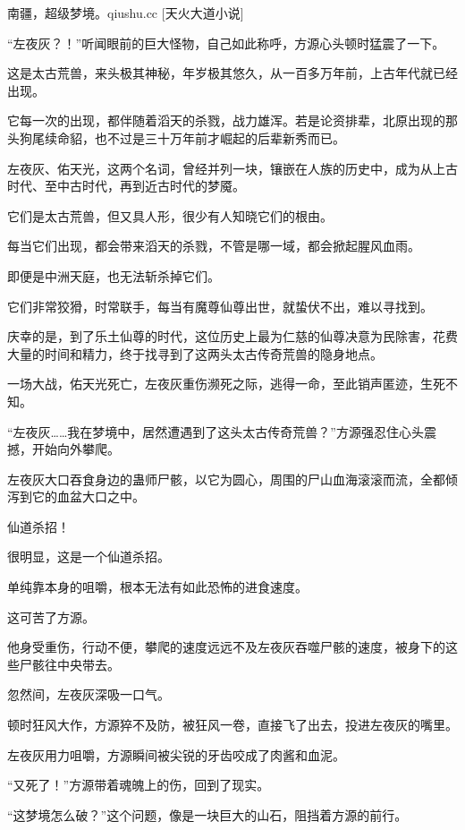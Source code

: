 
\begin{this_body}

南疆，超级梦境。qiushu.cc [天火大道小说]

“左夜灰？！”听闻眼前的巨大怪物，自己如此称呼，方源心头顿时猛震了一下。

这是太古荒兽，来头极其神秘，年岁极其悠久，从一百多万年前，上古年代就已经出现。

它每一次的出现，都伴随着滔天的杀戮，战力雄浑。若是论资排辈，北原出现的那头狗尾续命貂，也不过是三十万年前才崛起的后辈新秀而已。

左夜灰、佑天光，这两个名词，曾经并列一块，镶嵌在人族的历史中，成为从上古时代、至中古时代，再到近古时代的梦魇。

它们是太古荒兽，但又具人形，很少有人知晓它们的根由。

每当它们出现，都会带来滔天的杀戮，不管是哪一域，都会掀起腥风血雨。

即便是中洲天庭，也无法斩杀掉它们。

它们非常狡猾，时常联手，每当有魔尊仙尊出世，就蛰伏不出，难以寻找到。

庆幸的是，到了乐土仙尊的时代，这位历史上最为仁慈的仙尊决意为民除害，花费大量的时间和精力，终于找寻到了这两头太古传奇荒兽的隐身地点。

一场大战，佑天光死亡，左夜灰重伤濒死之际，逃得一命，至此销声匿迹，生死不知。

“左夜灰……我在梦境中，居然遭遇到了这头太古传奇荒兽？”方源强忍住心头震撼，开始向外攀爬。

左夜灰大口吞食身边的蛊师尸骸，以它为圆心，周围的尸山血海滚滚而流，全都倾泻到它的血盆大口之中。

仙道杀招！

很明显，这是一个仙道杀招。

单纯靠本身的咀嚼，根本无法有如此恐怖的进食速度。

这可苦了方源。

他身受重伤，行动不便，攀爬的速度远远不及左夜灰吞噬尸骸的速度，被身下的这些尸骸往中央带去。

忽然间，左夜灰深吸一口气。

顿时狂风大作，方源猝不及防，被狂风一卷，直接飞了出去，投进左夜灰的嘴里。

左夜灰用力咀嚼，方源瞬间被尖锐的牙齿咬成了肉酱和血泥。

“又死了！”方源带着魂魄上的伤，回到了现实。

“这梦境怎么破？”这个问题，像是一块巨大的山石，阻挡着方源的前行。


\end{this_body}
